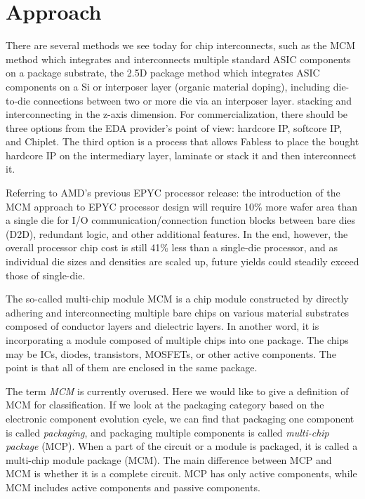 
\chapter{Approach}
\begin{spacing}{1.5}
\setlength{\parskip}{0.3in}

There are several methods we see today for chip interconnects, such as the MCM method which integrates and interconnects multiple standard ASIC components on a package substrate, the 2.5D package method which integrates ASIC components on a Si or interposer layer (organic material doping), including die-to-die connections between two or more die via an interposer layer. stacking and interconnecting in the z-axis dimension. For commercialization, there should be three options from the EDA provider's point of view: hardcore IP, softcore IP, and Chiplet. The third option is a process that allows Fabless to place the bought hardcore IP on the intermediary layer, laminate or stack it and then interconnect it.

Referring to AMD's previous EPYC processor release: the introduction of the MCM approach to EPYC processor design will require 10\% more wafer area than a single die for I/O communication/connection function blocks between bare dies (D2D), redundant logic, and other additional features. In the end, however, the overall processor chip cost is still 41\% less than a single-die processor, and as individual die sizes and densities are scaled up, future yields could steadily exceed those of single-die.

The so-called multi-chip module MCM is a chip module constructed by directly adhering and interconnecting multiple bare chips on various material substrates composed of conductor layers and dielectric layers. In another word, it is incorporating a module composed of multiple chips into one package. The chips may be ICs, diodes, transistors, MOSFETs, or other active components. The point is that all of them are enclosed in the same package.

The term \textit{MCM} is currently overused. Here we would like to give a definition of MCM for classification. If we look at the packaging category based on the electronic component evolution cycle, we can find that packaging one component is called \textit{packaging}, and packaging multiple components is called \textit{multi-chip package} (MCP). When a part of the circuit or a module is packaged, it is called a multi-chip module package (MCM). The main difference between MCP and MCM is whether it is a complete circuit. MCP has only active components, while MCM includes active components and passive components. 


\end{spacing}
